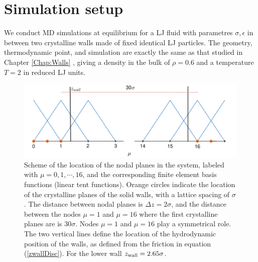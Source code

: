 \documentclass[b5paper,openright,10pt]{book}
\begin{document}
\section{Simulation setup}
\label{Sec:sim}
We conduct  MD simulations  at equilibrium  for a  LJ fluid
with  parametres $\sigma,\epsilon$  in between  two crystalline  walls
made  of fixed  identical LJ  particles.  The  geometry,
thermodynamic point, and simulation are  exactly the same as that studied in Chapter \ref{Chap:Walls} ,
giving  a  density in  the  bulk  of  $\rho=0.6  $ and  a  temperature
$T=2$ in reduced LJ  units.  
\begin{figure}[]
  \centering
  \includegraphics[scale=0.2]{SchemeNodes-4}
  \caption[Scheme of the location of the nodal planes in the system]{Scheme of the location of the nodal planes in the system, labeled
  with $\mu=0,1,\cdots,16$, and the corresponding finite element basis
  functions  (linear  tent  functions).    Orange  circles  indicate  the
  location  of the  crystalline  planes  of the  solid  walls, with  a
  lattice spacing  of $\sigma$. The  distance between nodal  planes is
  $\Delta z = 2\sigma$, and the distance between the nodes $\mu=1$ and
  $\mu=16$  where  the first  crystalline  planes  are is  $30\sigma$.
  Nodes  $\mu=1$  and  $\mu=16$  play a  symmetrical  role.   The  two
  vertical lines define  the location of the  hydrodynamic position of
  the walls, as  defined from the friction  in equation  (\ref{zwallDisc}).
  For the lower wall $z_{\rm wall}=2.65\sigma$. }
\label{Fig.Nodes}
\end{figure}
\end{document}
